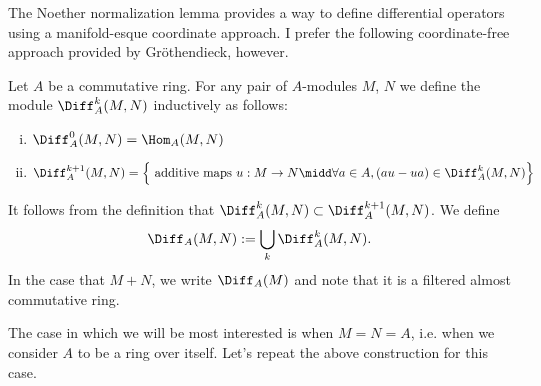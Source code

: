 \begin{rmk}\label{rmk:Noeth-Norm-gives-coord-def-of-diff-op}
	The Noether normalization lemma provides a way to define differential operators using a manifold-esque coordinate approach. I prefer the following coordinate-free approach provided by Gr\"othendieck, however.
\end{rmk}
\begin{defn}\label{defn:diff-ops}
	Let $A$ be a commutative ring. For any pair of $A$-modules $M$, $N$ we define the module $\Diff_A^{k}(M,N)$ inductively as follows:
	\begin{enumerate}[(i)]
		\item $\Diff_A^{0}(M,N) = \Hom_A(M,N)$
		\item $\Diff_A^{k+1}(M,N) = \left\{\text{ additive maps } u:M\to N \midd \forall a \in A, (a u - u a) \in \Diff^{k}_A(M,N)\right\}$
	\end{enumerate}
	It follows from the definition that $\Diff_{A}^{k}(M,N) \subset \Diff_A^{k+1}(M,N)$. We define
	\begin{align*}
		\Diff_A(M,N) := \bigcup_{k} \Diff_A^k(M,N).
	\end{align*}
	In the case that $M + N$, we write $\Diff_A(M)$ and note that it is a filtered almost commutative ring.
\end{defn}
The case in which we will be most interested is when $M = N = A$, i.e. when we consider $A$ to be a ring over itself. Let's repeat the above construction for this case.

